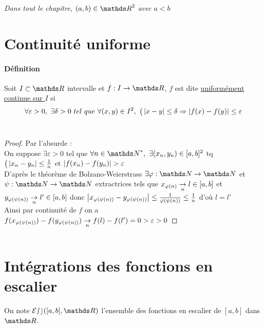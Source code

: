 

\minitoc
\textit{Dans tout le chapitre, $(a,b)\in\R^2$ avec $a<b$}
	\section{Continuité uniforme}
		\traitd
		\paragraph{Définition}
			Soit $I\subset\R$ intervalle et $f:I\rightarrow \R$, $f$ est dite \underline{uniformément continue sur $I$} si
			\[ \forall \varepsilon >0 ,~\exists \delta>0 ~tel~que~\forall (x,y)\in I^2,~\big( \left\vert x-y \right\vert\leq \delta \Rightarrow \left\vert f(x)-f(y) \right\vert\leq 
			\varepsilon \] \vspace*{-0.7cm} \trait
		\vspace*{0.5cm} \\ 
		\begin{proof}
		Par l'absurde : \\On suppose $\exists \varepsilon >0$ tel que $\forall n\in\N^* ,~\exists (x_n,y_n)\in [a,b]^2$ tq $\big( \left\vert x_n-y_n \right\vert 
		\leq \frac{1}{n}$ et $\left\vert f(x_n)-f(y_n) \right\vert > \varepsilon$ \\ D'après le théorème de Bolzano-Weierstrass %
        $\exists 
		\varphi :\N \rightarrow\N$ et $\psi : \N\rightarrow\N$ extractrices tels que $x_{\varphi(n)} \underset{n}{\rightarrow} l \in [a,b]$ et $y_{\varphi(\psi(n))} 
		\underset{n}{\rightarrow} l' \in[a,b]$ donc $\left\vert x_{\varphi(\psi(n))}-y_{\varphi(\psi(n))} \right\vert\leq \frac{1}{\varphi(\psi(n))} \leq \frac{1}{n}$ d'où $l=l'$ \\
		Ainsi par continuité de $f$ on a $f(x_{\varphi(\psi(n))}) - f(y_{\varphi(\psi(n))}) \underset{n}{\rightarrow} f(l)-f(l') = 0 >\varepsilon >0$
		\end{proof} ${}$
	\section{Intégrations des fonctions en escalier}
	On note $\mathcal{Esc}([a,b],\R)$ l'ensemble des fonctions en escalier de $[a,b]$ dans $\R$.
